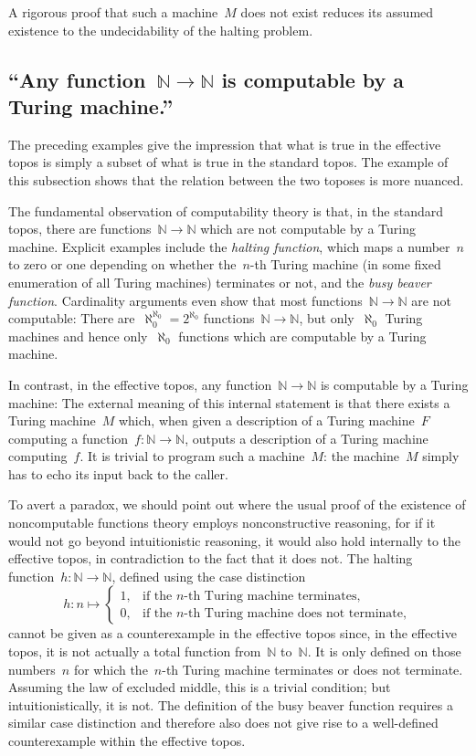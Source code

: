 \documentclass[oneside,reqno]{amsart}
\theoremstyle{definition}
\theoremstyle{plain}
\theoremstyle{remark}
\newcommand{\NN}{\mathbb{N}}
\renewcommand{\_}{\mathpunct{.}\,}
\newcommand{\effective}{ef{}fective\xspace}
\newcommand{\?}{\,{:}\,}
\begin{document}
A rigorous proof that such a machine~$M$ does not exist reduces its assumed
existence to the undecidability of the halting problem.


\subsection{``Any function~$\NN \to \NN$ is computable by a Turing machine.''}
The preceding examples give the impression that what is true in the
\effective topos is simply a subset of what is true in the standard topos. The
example of this subsection shows that the relation between the two toposes is more nuanced.


The fundamental observation of computability theory is that, in the standard
topos, there are functions~$\NN \to \NN$ which are not computable by a Turing
machine. Explicit examples include the \emph{halting
function}, which maps a number~$n$ to zero or one depending on whether
the~$n$-th Turing machine (in some fixed enumeration of all Turing machines)
terminates or not, and the \emph{busy beaver function}. Cardinality arguments
even show that most functions~$\NN \to \NN$ are not computable: There
are~$\aleph_0^{\aleph_0} = 2^{\aleph_0}$ functions~$\NN \to \NN$, but
only~$\aleph_0$ Turing machines and hence only~$\aleph_0$ functions which are
computable by a Turing machine.

In contrast, in the \effective topos, any function~$\NN \to \NN$ is computable
by a Turing machine: The external meaning of this internal statement is that
there exists a Turing machine~$M$ which, when given a description of a Turing
machine~$F$ computing a function~$f : \NN \to \NN$, outputs a description of a
Turing machine computing~$f$. It is trivial to program such a machine~$M$: the
machine~$M$ simply has to echo its input back to the caller.

To avert a paradox, we should point out where the usual proof of the
existence of noncomputable functions theory employs nonconstructive reasoning, for if
it would not go beyond intuitionistic reasoning, it would also hold internally to the
\effective topos, in contradiction to the fact that it does not. The halting
function~$h : \NN \to \NN$, defined using the case distinction
\[ h : n \mapsto \begin{cases}
  1, & \text{if the $n$-th Turing machine terminates}, \\
  0, & \text{if the $n$-th Turing machine does not terminate},
\end{cases} \]
cannot be given as a counterexample in the \effective topos since, in the
\effective topos, it is not actually a total function from~$\NN$ to~$\NN$. It
is only defined on those numbers~$n$ for which the~$n$-th Turing machine
terminates or does not terminate. Assuming the law of excluded middle, this is
a trivial condition; but intuitionistically, it is not. The definition of the
busy beaver function requires a similar case distinction and therefore also
does not give rise to a well-defined counterexample within the \effective
topos.
\end{document}
